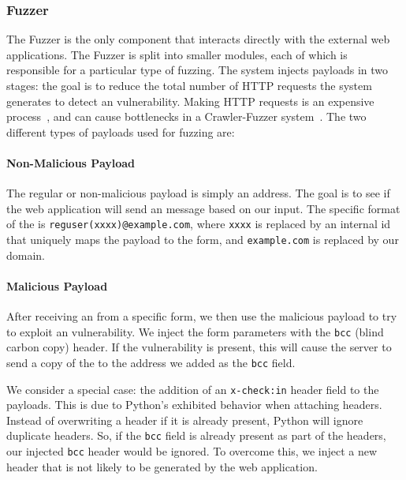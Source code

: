\subsubsection{Fuzzer}
\label{Comp:Fuzzer}
The Fuzzer is the only component that interacts directly with the external web applications. The Fuzzer is split into smaller modules, each of which is responsible for a particular type of fuzzing.  The system injects payloads in two stages: the goal is to reduce the total number of HTTP requests the system generates to detect an \ehi vulnerability. Making HTTP requests is an expensive process~\cite{McGrath2009}, and can cause bottlenecks in a Crawler-Fuzzer system~\cite{ShkapenyukTorstenSuel2001}.
The two different types of payloads used for fuzzing are:
\paragraph{Non-Malicious Payload}
\label{Comp:Fuzzer:nmp}
The regular or non-malicious payload is simply an \email address. The goal is to see if the web application will send an \email message based on our input. The specific format of the \email is \texttt{reguser(xxxx)@example.com}, where \texttt{xxxx} is replaced by an internal id that uniquely maps the payload to the form, and \texttt{example.com} is replaced by our domain.

\paragraph{Malicious Payload}
\label{Comp:Fuzzer:mp}
After receiving an \email from a specific form, we then use the malicious payload to try to exploit an \ehi vulnerability. We inject the form parameters with the \texttt{bcc} (blind carbon copy) header. If the vulnerability is present, this will cause the server to send a copy of the \email to the \email address we added as the \texttt{bcc} field.

We consider a special case: the addition of an \texttt{x-check:in} header field to the payloads. This is due to Python's exhibited behavior when attaching
headers. Instead of overwriting a header if it is already present, Python will ignore duplicate headers. So, if the \texttt{bcc} field is already present as part of the headers, our injected \texttt{bcc} header would be ignored. To overcome this, we inject a new header that is not likely to be generated by the web application. 

